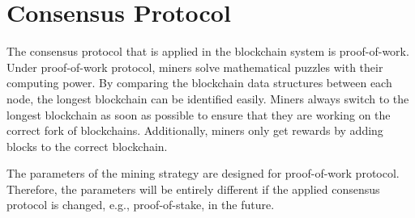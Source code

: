 \section{Consensus Protocol}

The consensus protocol that is applied in the blockchain system is proof-of-work. Under proof-of-work protocol, miners solve mathematical puzzles with their computing power. By comparing the blockchain data structures between each node, the longest blockchain can be identified easily. Miners always switch to the longest blockchain as soon as possible to ensure that they are working on the correct fork of blockchains. Additionally, miners only get rewards by adding blocks to the correct blockchain.

The parameters of the mining strategy are designed for proof-of-work protocol. Therefore, the parameters will be entirely different if the applied consensus protocol is changed, e.g., proof-of-stake, in the future.